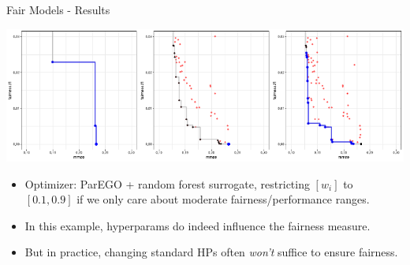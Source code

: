 \documentclass[11pt,compress,t,notes=noshow,xcolor=table]{beamer}
\begin{document}
\begin{vbframe}{Fair Models - Results}

\begin{center}
\includegraphics[scale=1.0]{slides/11-multicrit/figure_man/Pfisterer_et_al_2019_Multi_Objective_fig4.pdf}
\end{center}
\begin{itemize}
  \item Optimizer: ParEGO + random forest surrogate, restricting $[w_i]$ to $[0.1,0.9]$ if we only care about moderate fairness/performance ranges.
  \item In this example, hyperparams do indeed influence the fairness measure.
  \item But in practice, changing standard HPs often \emph{won’t} suffice to ensure fairness.
\end{itemize}

\end{vbframe}

\endlecture
\end{document}
